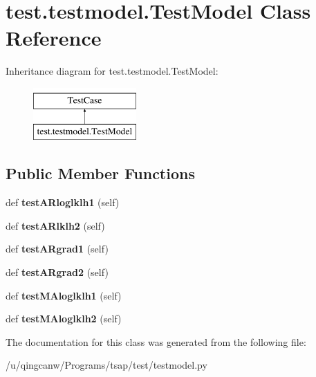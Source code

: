 \hypertarget{classtest_1_1testmodel_1_1TestModel}{}\section{test.\+testmodel.\+Test\+Model Class Reference}
\label{classtest_1_1testmodel_1_1TestModel}
Inheritance diagram for test.\+testmodel.\+Test\+Model\+:\begin{figure}[H]
\begin{center}
\leavevmode
\includegraphics[height=2.000000cm]{classtest_1_1testmodel_1_1TestModel}
\end{center}
\end{figure}
\subsection*{Public Member Functions}
\begin{DoxyCompactItemize}
\item 
\mbox{\label{classtest_1_1testmodel_1_1TestModel_a547a64497746faf47c4a522431033233}} 
def {\bfseries test\+A\+Rloglklh1} (self)
\item 
\mbox{\label{classtest_1_1testmodel_1_1TestModel_a3560e3dc4662df6986dc8b48dd81a421}} 
def {\bfseries test\+A\+Rlklh2} (self)
\item 
\mbox{\label{classtest_1_1testmodel_1_1TestModel_a8f40fb31c306f9969520fc9bf8a7ffd1}} 
def {\bfseries test\+A\+Rgrad1} (self)
\item 
\mbox{\label{classtest_1_1testmodel_1_1TestModel_a3f3cfe951bf743e47169ca992e25b285}} 
def {\bfseries test\+A\+Rgrad2} (self)
\item 
\mbox{\label{classtest_1_1testmodel_1_1TestModel_ad4a36eaadbdd8e1d0f4600f24a0c850d}} 
def {\bfseries test\+M\+Aloglklh1} (self)
\item 
\mbox{\label{classtest_1_1testmodel_1_1TestModel_a117218d6206e5ca859e9b376739552f7}} 
def {\bfseries test\+M\+Aloglklh2} (self)
\end{DoxyCompactItemize}


The documentation for this class was generated from the following file\+:\begin{DoxyCompactItemize}
\item 
/u/qingcanw/\+Programs/tsap/test/testmodel.\+py\end{DoxyCompactItemize}
